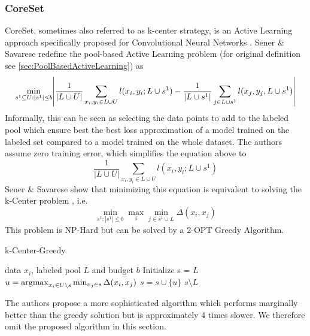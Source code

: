 \subsubsection{CoreSet}
CoreSet, sometimes also referred to as k-center strategy, is an Active Learning approach specifically proposed for Convolutional Neural
Networks \cite{sener2017active}. Sener \& Savarese redefine the pool-based Active Learning problem (for original definition see \ref{sec:PoolBasedActiveLearning})
as 
\begin{equation}
    \min_{s^1 \subseteq U: |s^1| \leq b } \abs{\frac{1}{|L \cup U|} \sum_{x_i,y_i \in L \cup U} l(x_i,y_i;L \cup s^1) - \frac{1}{|L \cup s^1|} \sum_{j \in L \cup s^1} l(x_j,y_j,L \cup s^1)} 
\end{equation}
Informally, this can be seen as selecting the data points to add to the labeled pool which ensure best the best loss approximation of a model trained on the labeled set compared
to a model trained on the whole dataset. The authors assume zero training error, which simplifies the equation above to
\begin{equation}
    \frac{1}{|L \cup U|} \sum_{x_i,y_i \in L \cup U} l(x_i,y_i;L \cup s^1)
\end{equation}
Sener \& Savarese show that minimizing this equation is equivalent to solving the k-Center problem \cite{wolf2011facility}, i.e.
\begin{equation}
    \min_{s^1: |s^1| \leq b} \max_i \min_{j \in s^1 \cup L}  \Delta (x_i,x_j)
\end{equation}
This problem is NP-Hard but can be solved by a 2-OPT Greedy Algorithm.
\begin{algorithm}
    \caption{k-Center-Greedy} \label{alg:kCenterGreedy}
    \begin{algorithmic}
        \Require data $x_i$, labeled pool $L$ and budget $b$
        \State Initialize s = $L$
        \Repeat
        \State $u = \operatorname*{\arg\!\max}_{x_i \in U \setminus s} \min_{x_j \in s} \Delta(x_i,x_j)$
        \State $s = s \cup \{u\}$
        \return $s \setminus L$
    \end{algorithmic}
\end{algorithm}
The authors propose a more sophisticated algorithm which performs marginally better than the greedy solution but is approximately 4 times slower. We therefore omit the proposed algorithm in this 
section.
